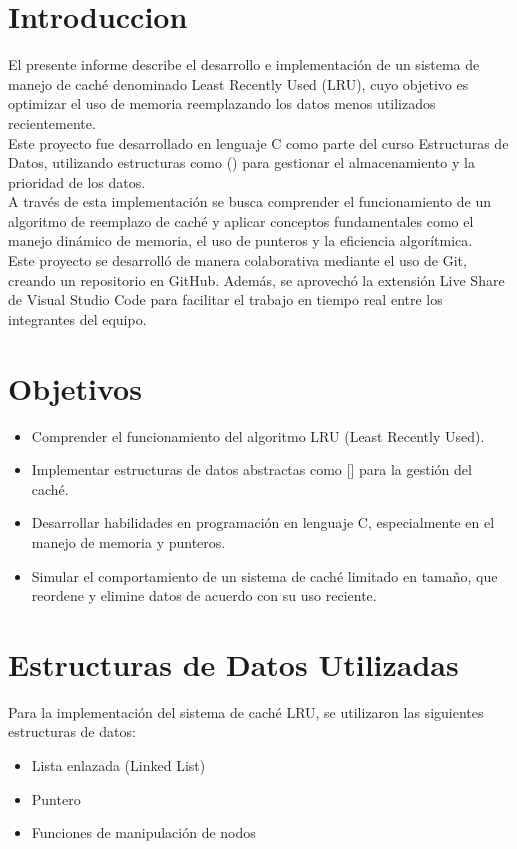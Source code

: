 
\section{Introduccion}
El presente informe describe el desarrollo e implementación de un sistema de manejo de caché denominado Least Recently Used (LRU), 
cuyo objetivo es optimizar el uso de memoria reemplazando los datos menos utilizados recientemente.\\
Este proyecto fue desarrollado en lenguaje C como parte del curso Estructuras de Datos, utilizando estructuras como () para gestionar el almacenamiento y 
la prioridad de los datos.\\
A través de esta implementación se busca comprender el funcionamiento de un algoritmo de reemplazo de caché y aplicar conceptos 
fundamentales como el manejo dinámico de memoria, el uso de punteros y la eficiencia algorítmica.\\
Este proyecto se desarrolló de manera colaborativa mediante el uso de Git, creando un repositorio en GitHub. Además, 
se aprovechó la extensión Live Share de Visual Studio Code para facilitar el trabajo en tiempo real entre los integrantes del equipo.
\newpage
\section{Objetivos}
\begin{itemize}
    \item Comprender el funcionamiento del algoritmo LRU (Least Recently Used).
    \item Implementar estructuras de datos abstractas como [] para la gestión del caché.
    \item Desarrollar habilidades en programación en lenguaje C, especialmente en el manejo de memoria y punteros.
    \item Simular el comportamiento de un sistema de caché limitado en tamaño, que reordene y elimine datos de acuerdo con su uso reciente.
\end{itemize}
\newpage
\section{Estructuras de Datos Utilizadas}
Para la implementación del sistema de caché LRU, se utilizaron las siguientes estructuras de datos:
\begin{itemize}
    \item Lista enlazada (Linked List)
    \item Puntero
    \item Funciones de manipulación de nodos
\end{itemize}
